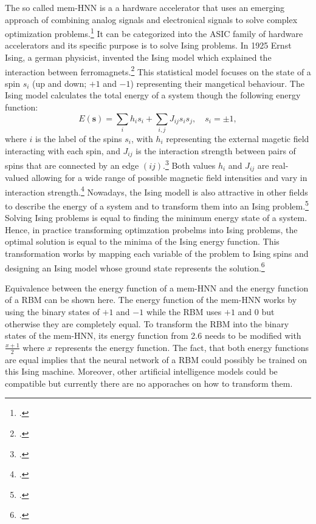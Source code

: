 The so called \ac{mem-HNN} is a a hardware accelerator that uses an emerging approach of combining analog signals and electronical signals to solve complex optimization problems.\footcite[cf.][410]{caiPowerefficientCombinatorialOptimization2020}
It can be categorized into the \ac{ASIC} family of hardware accelerators and its specific purpose is to solve Ising problems. 
In 1925 Ernst Ising, a german physicist, invented the Ising model which explained the interaction between ferromagnets.\footcite[cf.][253-258]{isingBeitragZurTheorie1925}
This statistical model focuses on the state of a spin \( s_{i} \) (up and down; \( +1 \) and \( -1 \)) representing their mangetical behaviour. 
The Ising model calculates the total energy of a system though the following energy function: 
\begin{equation}
    E(\mathbf{s}) = \sum_{i } h_i s_i + \sum_{i,j} J_{ij}s_{i}s_{j}, \quad s_i = \pm 1,
\end{equation}
where \( i \) is the label of the spins \( s_{i} \), with \( h_{i} \) representing the external magetic field  interacting with each spin, and \( J_{ij} \) is the interaction strength between pairs of spins that are connected by an edge \( (ij) \).\footcite[cf.][2]{tanahashiApplicationIsingMachines2019}
Both values \( h_{i} \) and  \( J_{ij} \) are real-valued allowing for a wide range of possible magnetic field intensities and vary in interaction strength.\footcite[cf.][1-2]{wangOscillatorbasedIsingMachine2017}
Nowadays, the Ising modell is also attractive in other fields to describe the energy of a system and to transform them into an Ising problem.\footcite[cf.][2-3]{tanahashiApplicationIsingMachines2019}
Solving Ising problems is equal to finding the minimum energy state of a system.
Hence, in practice transforming optimzation probelms into Ising problems, the optimal solution is equal to the minima of the Ising energy function. 
This transformation works by mapping each variable of the problem to Ising spins and designing an Ising model whose ground state represents the solution.\footcite[cf.][2-3]{lucasIsingFormulationsMany2014}

Equivalence between the energy function of a \ac{mem-HNN} and the energy function of a \ac{RBM} can be shown here.
The energy function of the \ac{mem-HNN} works by using the binary states of \( +1 \) and \( -1 \) while the \ac{RBM} uses \( +1 \) and \( 0 \) but otherwise they are completely equal.
To transform the \ac{RBM} into the binary states of the \ac{mem-HNN}, its energy function from 2.6 needs to be modified with \(\frac{x + 1}{2}\) where \( x \) represents the energy function.
The fact, that both energy functions are equal implies that the neural network of a \ac{RBM} could possibly be trained on this Ising machine.
Moreover, other artificial intelligence models could be compatible but currently there are no apporaches on how to transform them.

